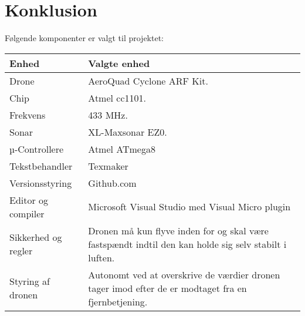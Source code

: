 \documentclass[Main]{subfiles}
\begin{document}
\chapter{Konklusion}
Følgende komponenter er valgt til projektet:\\

\begin{tabular}{p{} p{}}
\hline
Enhed & Valgte enhed \\ \hline
Drone & AeroQuad Cyclone ARF Kit. \\
Chip & Atmel cc1101.\\
Frekvens & 433 MHz.\\
Sonar & XL-Maxsonar EZ0.\\
µ-Controllere & Atmel ATmega8\\
Tekstbehandler & Texmaker\\
Versionsstyring & Github.com\\
Editor og compiler & Microsoft Visual Studio med Visual Micro plugin\\
Sikkerhed og regler & Dronen må kun flyve inden for og skal være fastspændt indtil den kan holde sig selv stabilt i luften.\\
Styring af dronen & Autonomt ved at overskrive de værdier dronen tager imod efter de er modtaget fra en fjernbetjening. \\ \hline
\end{tabular}
\end{document}
